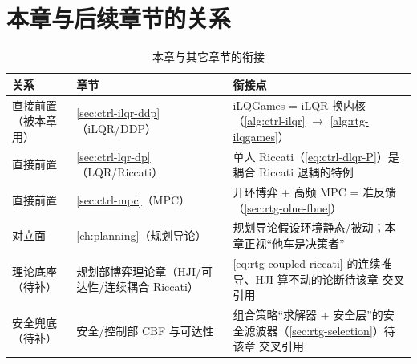 \section*{本章与后续章节的关系}
\begin{table}[H]\centering\small
\caption{本章与其它章节的衔接}
\label{tab:rtg-relations}
\begin{tabular}{p{} p{} p{}}
\toprule
关系 & 章节 & 衔接点 \\
\midrule
直接前置（被本章用） & \cref{sec:ctrl-ilqr-ddp}（iLQR/DDP） & iLQGames = iLQR 换内核（\cref{alg:ctrl-ilqr} $\to$ \cref{alg:rtg-ilqgames}） \\
直接前置 & \cref{sec:ctrl-lqr-dp}（LQR/Riccati） & 单人 Riccati（\cref{eq:ctrl-dlqr-P}）是耦合 Riccati 退耦的特例 \\
直接前置 & \cref{sec:ctrl-mpc}（MPC） & 开环博弈 + 高频 MPC = 准反馈（\cref{sec:rtg-olne-fbne}） \\
对立面 & \cref{ch:planning}（规划导论） & 规划导论假设环境静态/被动；本章正视“他车是决策者” \\
理论底座（待补） & 规划部博弈理论章（HJI/可达性/连续耦合 Riccati） & \cref{eq:rtg-coupled-riccati} 的连续推导、HJI 算不动的论断待该章 交叉引用 \\
安全兜底（待补） & 安全/控制部 CBF 与可达性 & 组合策略“求解器 + 安全层”的安全滤波器（\cref{sec:rtg-selection}）待该章 交叉引用 \\
\bottomrule
\end{tabular}
\end{table}

